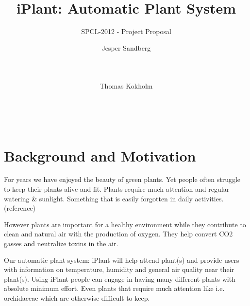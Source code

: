 \documentclass{ubicomp2012}
\begin{document}
\setlength{\paperheight}{11in}
\setlength{\paperwidth}{8.5in}
\setlength{\pdfpageheight}{\paperheight}
\setlength{\pdfpagewidth}{\paperwidth}




\title{iPlant: Automatic Plant System}
\subtitle{SPCL-2012 - Project Proposal}
\author{
  \alignauthor Jesper Sandberg\\
    \\
    \\
    \\
 \alignauthor Thomas Kokholm\\
    \\
    \\
    \\
      }
\maketitle

\section{Background and Motivation}
For years we have enjoyed the beauty of green plants. Yet people often struggle to keep their plants alive and fit. Plants require much attention and regular watering \& sunlight. Something that is easily forgotten in daily activities. (reference)

However plants are important for a healthy environment while they contribute to clean and natural air with the production of oxygen.
They help convert CO2 gasses and neutralize toxins in the air.

Our automatic plant system: iPlant will help attend plant(s) and provide users with information on temperature, humidity and general air quality near their plant(s). Using iPlant people can engage in having many different plants with absolute minimum effort. Even plants that require much attention like i.e. orchidaceae which are otherwise difficult to keep.
\end{document}
